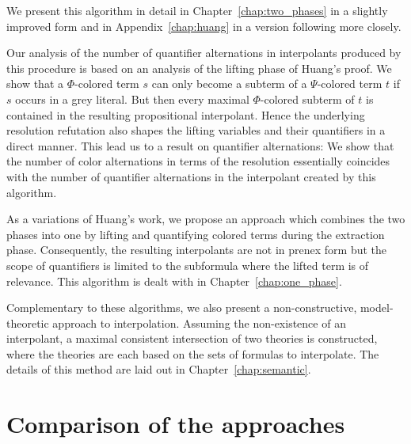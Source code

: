 We present this algorithm in detail in Chapter~\ref{chap:two_phases} in a slightly improved form and in Appendix~\ref{chap:huang} in a version following \cite{Huang95} more closely. 


Our analysis of the number of quantifier alternations in interpolants produced by this procedure is based on an analysis of the lifting phase of Huang's proof.
We show that a $\Phi$-colored term $s$ can only become a subterm of a $\Psi$-colored term $t$ if $s$ occurs in a grey literal.
But then every maximal $\Phi$-colored subterm of $t$ is contained in the resulting propositional interpolant.
Hence the underlying resolution refutation also shapes the lifting variables and their quantifiers in a direct manner.
This lead us to a result on quantifier alternations:
We show that the number of color alternations in terms of the resolution essentially coincides with the number of quantifier alternations in the interpolant created by this algorithm.



As a variations of Huang's work, we propose an approach which combines the two phases into one 
by lifting and quantifying colored terms during the extraction phase. 
Consequently, the resulting interpolants are not in prenex form but the scope of quantifiers is limited to the subformula where the lifted term is of relevance.
This algorithm is dealt with in Chapter~\ref{chap:one_phase}.

Complementary to these algorithms, we also present a non-constructive, model-theoretic approach to interpolation.
Assuming the non-existence of an interpolant, a maximal consistent intersection of two theories is constructed, where the theories are each based on the sets of formulas to interpolate. The details of this method are laid out in Chapter~\ref{chap:semantic}.


\section{Comparison of the approaches}

